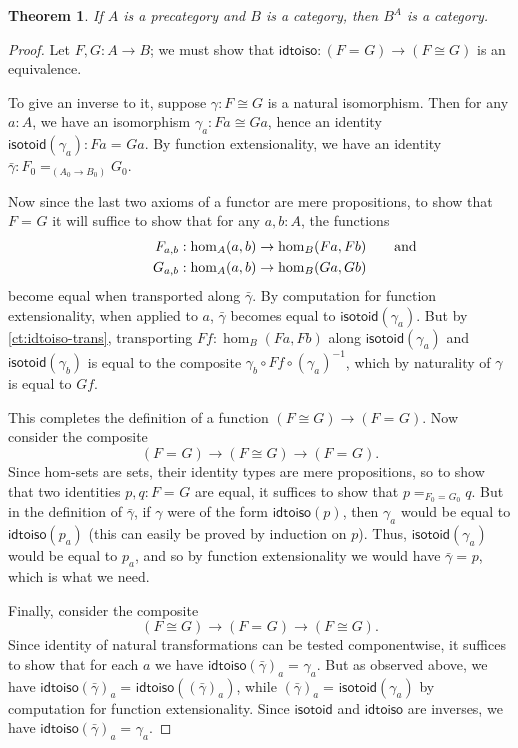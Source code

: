 \documentclass{amsart}
\newcommand{\id}[3][]{\ensuremath{#2 =_{#1} #3}\xspace}
\newtheorem{thm}{Theorem}[section]
\theoremstyle{definition}
\theoremstyle{remark}
\numberwithin{equation}{section}
\newcommand{\inv}[1]{{#1}^{-1}}
\newcommand{\idtoiso}{\ensuremath{\mathsf{idtoiso}}\xspace}
\newcommand{\isotoid}{\ensuremath{\mathsf{isotoid}}\xspace}
\begin{document}
\begin{thm}\label{ct:functor-cat}
  If $A$ is a precategory and $B$ is a category, then $B^A$ is a category.
\end{thm}
\begin{proof}
  Let $F,G:A\to B$; we must show that $\idtoiso:(\id{F}{G}) \to (F\cong G)$ is an equivalence.

  To give an inverse to it, suppose $\gamma:F\cong G$ is a natural isomorphism.
  Then for any $a:A$, we have an isomorphism $\gamma_a:Fa \cong Ga$, hence an identity $\isotoid(\gamma_a):\id{Fa}{Ga}$.
  By function extensionality, we have an identity $\bar{\gamma}:\id[(A_0\to B_0)]{F_0}{G_0}$.

  Now since the last two axioms of a functor are mere propositions, to show that $\id{F}{G}$ it will suffice to show that for any $a,b:A$, the functions
  \begin{align*}
    F_{a,b}&:\hom_A(a,b) \to \hom_B(Fa,Fb)\mathrlap{\qquad\text{and}}\\
    G_{a,b}&:\hom_A(a,b) \to \hom_B(Ga,Gb)
  \end{align*}
  become equal when transported along $\bar\gamma$.
  By computation for function extensionality, when applied to $a$, $\bar\gamma$ becomes equal to $\isotoid(\gamma_a)$.
  But by \autoref{ct:idtoiso-trans}, transporting $Ff:\hom_B(Fa,Fb)$ along $\isotoid(\gamma_a)$ and $\isotoid(\gamma_b)$ is equal to the composite $\gamma_b\circ Ff\circ \inv{(\gamma_a)}$, which by naturality of $\gamma$ is equal to $Gf$.

  This completes the definition of a function $(F\cong G) \to (\id F G)$.
  Now consider the composite
  \[ (\id F G) \to (F\cong G) \to (\id F G). \]
  Since hom-sets are sets, their identity types are mere propositions, so to show that two identities $p,q:\id F G$ are equal, it suffices to show that $\id[\id{F_0}{G_0}]{p}{q}$.
  But in the definition of $\bar\gamma$, if $\gamma$ were of the form $\idtoiso(p)$, then $\gamma_a$ would be equal to $\idtoiso(p_a)$ (this can easily be proved by induction on $p$).
  Thus, $\isotoid(\gamma_a)$ would be equal to $p_a$, and so by function extensionality we would have $\id{\bar\gamma}{p}$, which is what we need.

  Finally, consider the composite
  \[(F\cong G)\to  (\id F G) \to (F\cong G). \]
  Since identity of natural transformations can be tested componentwise, it suffices to show that for each $a$ we have $\id{\idtoiso(\bar\gamma)_a}{\gamma_a}$.
  But as observed above, we have $\id{\idtoiso(\bar\gamma)_a}{\idtoiso((\bar\gamma)_a)}$, while $\id{(\bar\gamma)_a}{\isotoid(\gamma_a)}$ by computation for function extensionality.
  Since $\isotoid$ and $\idtoiso$ are inverses, we have $\id{\idtoiso(\bar\gamma)_a}{\gamma_a}$.
\end{proof}
\end{document}
